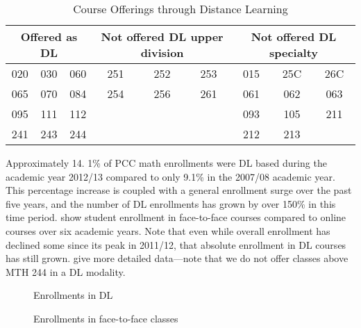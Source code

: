 \begin{table}
	\caption{Course Offerings through Distance Learning}\label{tab:sec3:DLofferings}
	\centering
	\begin{tabular}{ccccccccc}
		\toprule
		\multicolumn{3}{p{1in}}{Offered as DL} & \multicolumn{3}{p{1in}}{Not offered  DL upper division} & \multicolumn{3}{p{1in}}{Not offered  DL specialty}                                     \\
		\midrule
		020                                    & 030                                                     & 060                                                & 251 & 252 & 253 & 015 & 25C & 26C \\
		065                                    & 070                                                     & 084                                                & 254 & 256 & 261 & 061 & 062 & 063 \\
		095                                    & 111                                                     & 112                                                &     &     &     & 093 & 105 & 211 \\
		241                                    & 243                                                     & 244                                                &     &     &     & 212 & 213       \\
		\bottomrule
	\end{tabular}
\end{table}

Approximately 14.
1\% of PCC math enrollments were DL based during the
academic year 2012/13 compared to only 9.1\% in the 2007/08 academic year.
This percentage increase is coupled with a general enrollment surge over the past five years, and the number of DL enrollments has grown by over 150\% in this time period.
 show
student enrollment in face-to-face courses compared to online courses over six
academic years.
Note that even while overall enrollment has declined some since its peak in 2011/12, that absolute enrollment in DL courses has still grown.
 give more detailed
data---note that we do not offer classes above MTH 244 in a DL modality.

\begin{figure}[!htb]
	\begin{minipage}[t]{.5\textwidth}
		
		\caption{Enrollments in DL}\label{fig:sec3:DLenrollments}
	\end{minipage}%
	\begin{minipage}[t]{.5\textwidth}
		
		\caption{Enrollments in face-to-face classes}\label{fig:sec3:F2Fenrollments}
	\end{minipage}
\end{figure}

